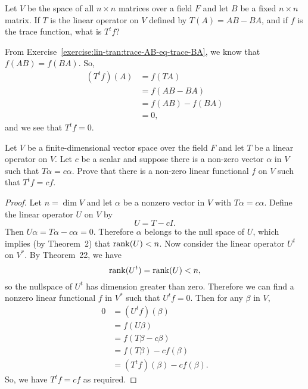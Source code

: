  Let $V$ be the space of all $n\times n$ matrices over a
field $F$ and let $B$ be a fixed $n\times n$ matrix. If $T$ is the
linear operator on $V$ defined by $T(A) = AB - BA$, and if $f$ is the
trace function, what is $T^tf$?
\begin{solution}
  From Exercise~\ref{exercise:lin-tran:trace-AB-eq-trace-BA}, we know
  that $f(AB) = f(BA)$. So,
  \begin{align*}
    (T^tf)(A)
    &= f(TA) \\
    &= f(AB - BA) \\
    &= f(AB) - f(BA) \\
    &= 0,
  \end{align*}
  and we see that $T^tf = 0$.
\end{solution}

 Let $V$ be a finite-dimensional vector space over the field
$F$ and let $T$ be a linear operator on $V$. Let $c$ be a scalar and
suppose there is a non-zero vector $\alpha$ in $V$ such that
$T\alpha = c\alpha$. Prove that there is a non-zero linear functional
$f$ on $V$ such that $T^tf = cf$.
\begin{proof}
  Let $n = \dim V$ and let $\alpha$ be a nonzero vector in $V$ with
  $T\alpha = c\alpha$. Define the linear operator $U$ on $V$ by
  \begin{equation*}
    U = T - cI.
  \end{equation*}
  Then $U\alpha = T\alpha - c\alpha = 0$. Therefore $\alpha$ belongs
  to the null space of $U$, which implies (by Theorem~2) that
  $\operatorname{rank}(U) < n$. Now consider the linear operator $U^t$ on $V^*$. By
  Theorem~22, we have
  \begin{equation*}
    \operatorname{rank}(U^t) = \operatorname{rank}(U) < n,
  \end{equation*}
  so the nullspace of $U^t$ has dimension greater than zero. Therefore
  we can find a nonzero linear functional $f$ in $V^*$ such that
  $U^tf = 0$. Then for any $\beta$ in $V$,
  \begin{align*}
    0
    &= (U^tf)(\beta) \\
    &= f(U\beta) \\
    &= f(T\beta - c\beta) \\
    &= f(T\beta) - cf(\beta) \\
    &= (T^tf)(\beta) - cf(\beta).
  \end{align*}
  So, we have $T^tf = cf$ as required.
\end{proof}
